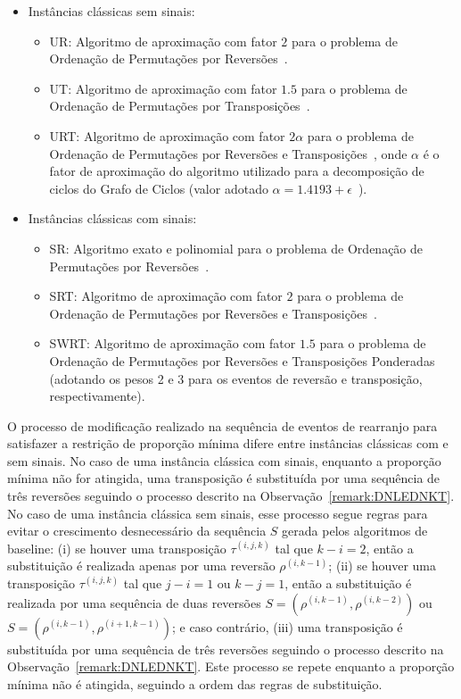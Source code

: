 \begin{itemize}
    \item Instâncias clássicas sem sinais:
    \begin{itemize}
        \item UR: Algoritmo de aproximação com fator $2$ para o problema de Ordenação de Permutações por Reversões~\cite{1995-kececioglu-sankoff}.
        \item UT: Algoritmo de aproximação com fator $1.5$ para o problema de Ordenação de Permutações por Transposições~\cite{1998-bafna-pevzner}.
        \item URT: Algoritmo de aproximação com fator $2\alpha$ para o problema de Ordenação de Permutações por Reversões e Transposições~\cite{2008-rahman-etal}, onde $\alpha$ é o fator de aproximação do algoritmo utilizado para a decomposição de ciclos do Grafo de Ciclos (valor adotado $\alpha = 1.4193 + \epsilon$~\cite{2004-lin-jiang}).
    \end{itemize}
    \item Instâncias clássicas com sinais:
    \begin{itemize}
        \item SR: Algoritmo exato e polinomial para o problema de Ordenação de Permutações por Reversões~\cite{1999-hannenhalli-pevzner}.
        \item SRT: Algoritmo de aproximação com fator $2$ para o problema de Ordenação de Permutações por Reversões e Transposições~\cite{1998-walter-etal}.
        \item SWRT: Algoritmo de aproximação com fator $1.5$ para o problema de Ordenação de Permutações por Reversões e Transposições Ponderadas~\cite{2019a-oliveira-etal} (adotando os pesos 2 e 3 para os eventos de reversão e transposição, respectivamente).
    \end{itemize}
\end{itemize}

O processo de modificação realizado na sequência de eventos de rearranjo para satisfazer a restrição de proporção mínima difere entre instâncias clássicas com e sem sinais. No caso de uma instância clássica com sinais, enquanto a proporção mínima não for atingida, uma transposição é substituída por uma sequência de três reversões seguindo o processo descrito na Observação~\ref{remark:DNLEDNKT}. No caso de uma instância clássica sem sinais, esse processo segue regras para evitar o crescimento desnecessário da sequência $S$ gerada pelos algoritmos de baseline: (i) se houver uma transposição $\tau^{(i, j, k)}$ tal que $k - i = 2$, então a substituição é realizada apenas por uma reversão $\rho^{(i, k - 1)}$; (ii) se houver uma transposição $\tau^{(i, j, k)}$ tal que $j - i = 1$ ou $k - j = 1$, então a substituição é realizada por uma sequência de duas reversões $S=(\rho^{(i, k - 1)},\rho^{(i, k - 2)})$ ou $S=(\rho^{(i, k - 1)},\rho^{(i + 1, k - 1)})$; e caso contrário, (iii) uma transposição é substituída por uma sequência de três reversões seguindo o processo descrito na Observação~\ref{remark:DNLEDNKT}. Este processo se repete enquanto a proporção mínima não é atingida, seguindo a ordem das regras de substituição.

